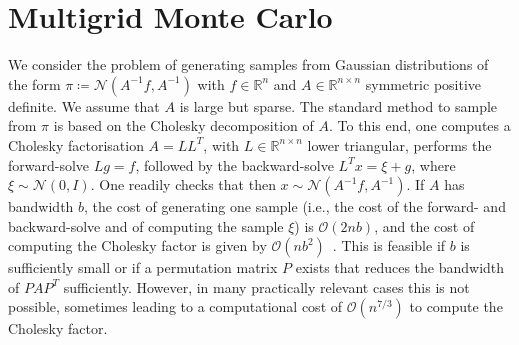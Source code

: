 \documentclass[
fontsize=11pt,
paper=a4,
numbers=noenddot
]{scrartcl}
\begin{document}
\section{Multigrid Monte Carlo}
We consider the problem of generating samples from Gaussian distributions of the form $\pi\coloneqq\mathcal{N}(A^{-1}f, A^{-1})$ with $f \in \mathbb{R}^n$ and $A \in \mathbb{R}^{n \times n}$ symmetric positive definite. We assume that $A$ is large but sparse.
The standard method to sample from $\pi$ is based on the Cholesky decomposition of $A$. To this end, one computes a Cholesky factorisation $A = LL^T$, with $L \in \mathbb{R}^{n \times n}$ lower triangular, performs the forward-solve $L g = f$, followed by the backward-solve $L^T x = \xi + g$, where $\xi \sim \mathcal{N}(0,I)$. One readily checks that then $x \sim \mathcal{N}(A^{-1}f, A^{-1})$. If $A$ has bandwidth $b$, the cost of generating one sample (i.e., the cost of the forward- and backward-solve and of computing the sample $\xi$) is $\mathcal{O}(2nb)$, and the cost of computing the Cholesky factor is given by $\mathcal{O}(nb^2)$~\cite{golubvanloan}. This is feasible if $b$ is sufficiently small or if a permutation matrix $P$ exists that reduces the bandwidth of $PAP^T$ sufficiently. However, in many practically relevant cases this is not possible, sometimes leading to a computational cost of $\mathcal{O}(n^{7/3})$ to compute the Cholesky factor.

\end{document}
